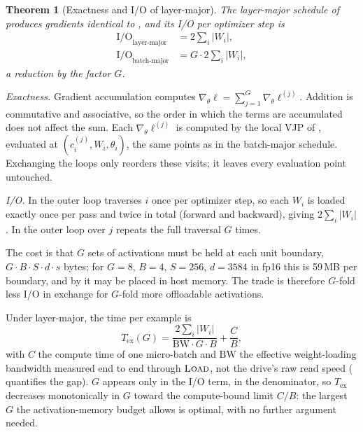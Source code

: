 \documentclass[journal]{IEEEtran}
\newtheorem{theorem}{Theorem}
\begin{document}
\begin{theorem}[Exactness and I/O of layer-major]
\label{thm:lm}
The layer-major schedule of  produces gradients identical to , and its
I/O per optimizer step is
\begin{align}
\mathrm{I/O}_{\text{layer-major}} &= 2\sum_i |W_i| , \\
\mathrm{I/O}_{\text{batch-major}} &= G \cdot 2\sum_i |W_i| ,
\end{align}
a reduction by the factor $G$.
\end{theorem}

\begin{IEEEproof}
\emph{Exactness.} Gradient accumulation computes
$\nabla_\theta \ell = \sum_{j=1}^{G} \nabla_\theta \ell^{(j)}$. Addition is commutative and
associative, so the order in which the terms are accumulated does not affect the sum. Each
$\nabla_\theta \ell^{(j)}$ is computed by the local VJP of , evaluated at
$(c_i^{(j)}, W_i, \theta_i)$, the same points as in the batch-major schedule. Exchanging the loops
only reorders these visits; it leaves every evaluation point untouched.

\emph{I/O.} In  the outer loop traverses $i$ once per optimizer step, so each $W_i$ is
loaded exactly once per pass and twice in total (forward and backward), giving $2\sum_i |W_i|$. In
 the outer loop over $j$ repeats the full traversal $G$ times.
\end{IEEEproof}

The cost is that $G$ sets of activations must be held at each unit boundary,
$G \cdot B \cdot S \cdot d \cdot s$ bytes; for $G=8$, $B=4$, $S=256$, $d=3584$ in fp16 this is
59\,MB per boundary, and by  it may be placed in host memory. The trade is
therefore $G$-fold less I/O in exchange for $G$-fold more offloadable activations.

Under layer-major, the time per example is
\begin{equation}
\label{eq:choiceG}
T_{\text{ex}}(G) = \frac{2\sum_i |W_i|}{\mathrm{BW}\cdot G\cdot B} + \frac{C}{B},
\end{equation}
with $C$ the compute time of one micro-batch and $\mathrm{BW}$ the effective weight-loading
bandwidth measured end to end through $\textsc{Load}$, not the drive's raw read speed
( quantifies the gap). $G$ appears only in the I/O term, in the denominator, so
$T_{\text{ex}}$ decreases monotonically in $G$ toward the compute-bound limit $C/B$: the largest $G$
the activation-memory budget allows is optimal, with no further argument needed.
\end{document}
